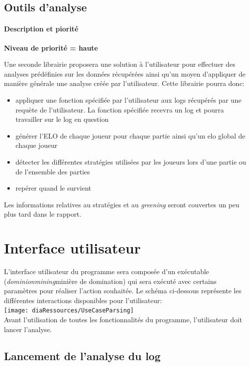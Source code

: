\subsection{Outils d'analyse}

\paragraph*{Description et piorité}

\textbf{Niveau de priorité = haute}

Une seconde librairie proposera une solution à l'utilisateur pour effectuer des analyses prédéfinies sur les données récupérées ainsi qu'un moyen d'appliquer de manière générale une analyse créée par l'utilisateur. Cette librairie pourra donc:
\begin{itemize}
\item appliquer une fonction spécifiée par l'utilisateur aux logs récupérés par une requète de l'utilisateur. La fonction spécifiée recevra un log et pourra travailler sur le log en question
\item générer l'ELO de chaque joueur pour chaque partie ainsi qu'un elo global de chaque joueur
\item détecter les différentes stratégies utilisées par les joueurs lors d'une partie ou de l'ensemble des parties
\item repérer quand le  survient
\end{itemize}

Les informations relatives au stratégies et au \textit{greening} seront couvertes un peu plus tard dans le rapport.
\iffalse
\section{Interface utilisateur}
L'interface utilisateur du programme sera composée d'un exécutable (\textit{dominionmining}minière de domination) qui sera exécuté avec certains paramètres pour réaliser l'action souhaitée. Le schéma ci-dessous représente les différentes interactions disponibles pour l'utilisateur:\\

\texttt{[image: diaRessources/UseCaseParsing]}\\
Avant l'utilisation de toutes les fonctionnalités du programme, l'utilisateur doit lancer l'analyse.
\subsection{Lancement de l'analyse du log}

